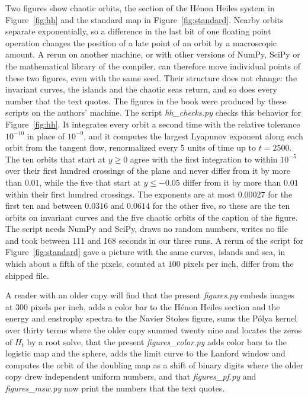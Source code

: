 Two figures show chaotic orbits, the section of the H\'enon Heiles system in Figure~\ref{fig:hh} and the standard map in Figure~\ref{fig:standard}. Nearby orbits separate exponentially, so a difference in the last bit of one floating point operation changes the position of a late point of an orbit by a macroscopic amount. A rerun on another machine, or with other versions of NumPy, SciPy or the mathematical library of the compiler, can therefore move individual points of these two figures, even with the same seed. Their structure does not change: the invariant curves, the islands and the chaotic seas return, and so does every number that the text quotes. The figures in the book were produced by these scripts on the authors' machine. The script \textit{hh\_checks.py} checks this behavior for Figure~\ref{fig:hh}. It integrates every orbit a second time with the relative tolerance $10^{-10}$ in place of $10^{-9}$, and it computes the largest Lyapunov exponent along each orbit from the tangent flow, renormalized every $5$ units of time up to $t=2500$. The ten orbits that start at $y\ge0$ agree with the first integration to within $10^{-5}$ over their first hundred crossings of the plane and never differ from it by more than $0.01$, while the five that start at $y\le-0.05$ differ from it by more than $0.01$ within their first hundred crossings. The exponents are at most $0.00027$ for the first ten and between $0.0316$ and $0.0614$ for the other five, so these are the ten orbits on invariant curves and the five chaotic orbits of the caption of the figure. The script needs NumPy and SciPy, draws no random numbers, writes no file and took between 111 and 168 seconds in our three runs. A rerun of the script for Figure~\ref{fig:standard} gave a picture with the same curves, islands and sea, in which about a fifth of the pixels, counted at $100$ pixels per inch, differ from the shipped file.

A reader with an older copy will find that the present \textit{figures.py} embeds images at 300 pixels per inch, adds a color bar to the H\'enon Heiles section and the energy and enstrophy spectra to the Navier Stokes figure, sums the P\'olya kernel over thirty terms where the older copy summed twenty nine and locates the zeros of $H_t$ by a root solve, that the present \textit{figures\_color.py} adds color bars to the logistic map and the sphere, adds the limit curve to the Lanford window and computes the orbit of the doubling map as a shift of binary digits where the older copy drew independent uniform numbers, and that \textit{figures\_pf.py} and \textit{figures\_msw.py} now print the numbers that the text quotes.

